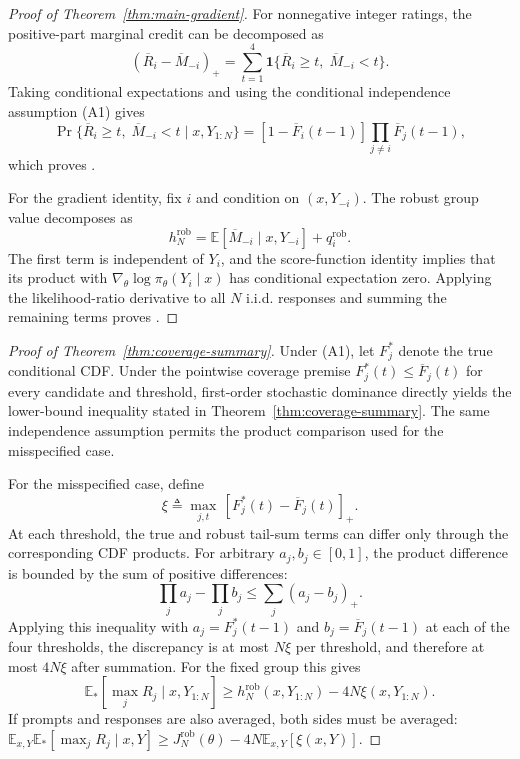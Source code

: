 \begin{proof}[Proof of Theorem~\ref{thm:main-gradient}]
For nonnegative integer ratings, the positive-part marginal credit can be decomposed as
\[
(\overline R_i-\overline M_{-i})_+ = \sum_{t=1}^{4} \mathbf{1}\{\overline R_i \ge t,\; \overline M_{-i} < t\}.
\]
Taking conditional expectations and using the conditional independence assumption (A1) gives
\[
\Pr\{\overline R_i \ge t,\; \overline M_{-i} < t \mid x,Y_{1:N}\}
=
[1-\overline F_i(t-1)] \prod_{j \ne i} \overline F_j(t-1),
\]
which proves .

For the gradient identity, fix \(i\) and condition on \((x, Y_{-i})\). The robust group value decomposes as
\[
h_N^{\mathrm{rob}} = \mathbb E[\overline M_{-i} \mid x, Y_{-i}] + q_i^{\mathrm{rob}}.
\]
The first term is independent of \(Y_i\), and the score-function identity implies that its product with \(\nabla_\theta \log \pi_\theta(Y_i \mid x)\) has conditional expectation zero. Applying the likelihood-ratio derivative to all \(N\) i.i.d. responses and summing the remaining terms proves .
\end{proof}

\begin{proof}[Proof of Theorem~\ref{thm:coverage-summary}]
Under (A1), let \(F_j^*\) denote the true conditional CDF. Under the pointwise
coverage premise \(F_j^*(t) \le \overline F_j(t)\) for every candidate and
threshold, first-order stochastic dominance directly yields the lower-bound
inequality stated in Theorem~\ref{thm:coverage-summary}. The same independence
assumption permits the product comparison used for the misspecified case.

For the misspecified case, define
\[
\xi \triangleq \max_{j,t}\, [F_j^*(t) - \overline F_j(t)]_+.
\]
At each threshold, the true and robust tail-sum terms can differ only through the corresponding CDF products. For arbitrary \(a_j, b_j \in [0,1]\), the product difference is bounded by the sum of positive differences:
\[
\prod_j a_j - \prod_j b_j \le \sum_j (a_j - b_j)_+.
\]
Applying this inequality with \(a_j = F_j^*(t-1)\) and \(b_j = \overline F_j(t-1)\) at each of the four thresholds, the discrepancy is at most \(N\xi\) per threshold, and therefore at most \(4N\xi\) after summation. For the fixed group this gives
\[
\mathbb E_*[\max_j R_j\mid x,Y_{1:N}]
\ge h_N^{\mathrm{rob}}(x,Y_{1:N})-4N\xi(x,Y_{1:N}).
\]
If prompts and responses are also averaged, both sides must be averaged:
\(\mathbb E_{x,Y}\mathbb E_*[\max_jR_j\mid x,Y]
\ge J_N^{\mathrm{rob}}(\theta)-4N\mathbb E_{x,Y}[\xi(x,Y)]\).
\end{proof}

